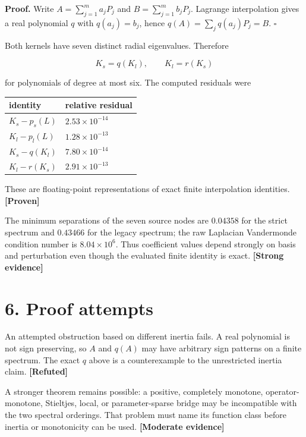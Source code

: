 \documentclass[11pt,a4paper,openany]{report}
\newcommand{\statusProven}{\textcolor{fingreen}{[Proven]}}
\newcommand{\statusStrong}{\textcolor{finblue}{[Strong evidence]}}
\newcommand{\statusModerate}{\textcolor{finviolet}{[Moderate evidence]}}
\newcommand{\statusRefuted}{\textcolor{finred}{[Refuted]}}
\begin{document}
\textbf{Proof.} Write \(A=\sum_{j=1}^m a_jP_j\) and \(B=\sum_{j=1}^m b_jP_j\). Lagrange interpolation gives a real polynomial \(q\) with \(q(a_j)=b_j\), hence \(q(A)=\sum_jq(a_j)P_j=B\). \(\square\)

Both kernels have seven distinct radial eigenvalues. Therefore

\[
K_s=q(K_l),\qquad K_l=r(K_s)
\]

for polynomials of degree at most six. The computed residuals were

\begin{center}
\begingroup\small
\setlength{\tabcolsep}{3.5pt}
\renewcommand{\arraystretch}{1.16}
\begin{longtable}{@{}p{}p{}@{}}
\toprule
\textbf{identity} & \textbf{relative residual} \\
\midrule
\endhead
\(K_s-p_s(L)\) & \(2.53\times10^{-14}\) \\
\(K_l-p_l(L)\) & \(1.28\times10^{-13}\) \\
\(K_s-q(K_l)\) & \(7.80\times10^{-14}\) \\
\(K_l-r(K_s)\) & \(2.91\times10^{-13}\) \\
\bottomrule
\end{longtable}
\endgroup
\end{center}

These are floating-point representations of exact finite interpolation identities. \textbf{\statusProven{}}

The minimum separations of the seven source nodes are \(0.04358\) for the strict spectrum and \(0.43466\) for the legacy spectrum; the raw Laplacian Vandermonde condition number is \(8.04\times10^6\). Thus coefficient values depend strongly on basis and perturbation even though the evaluated finite identity is exact. \textbf{\statusStrong{}}

\section{6. Proof attempts}

An attempted obstruction based on different inertia fails. A real polynomial is not sign preserving, so \(A\) and \(q(A)\) may have arbitrary sign patterns on a finite spectrum. The exact \(q\) above is a counterexample to the unrestricted inertia claim. \textbf{\statusRefuted{}}

A stronger theorem remains possible: a positive, completely monotone, operator-monotone, Stieltjes, local, or parameter-sparse bridge may be incompatible with the two spectral orderings. That problem must name its function class before inertia or monotonicity can be used. \textbf{\statusModerate{}}
\end{document}
